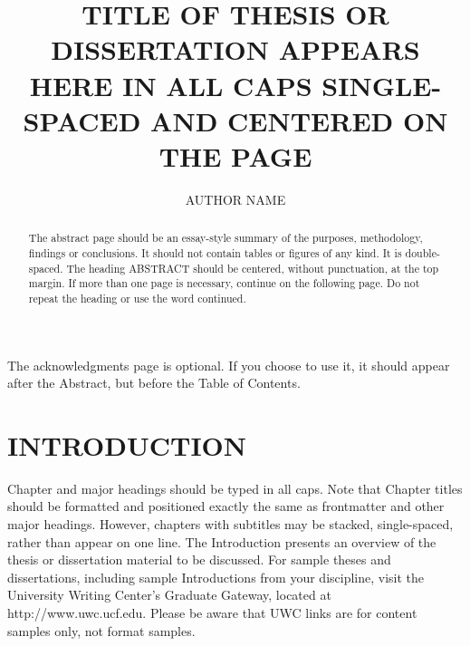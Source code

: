 \documentclass{UCF_ETD}
\title{TITLE OF THESIS OR DISSERTATION APPEARS HERE IN ALL CAPS SINGLE-SPACED AND CENTERED ON THE PAGE} %
\author{AUTHOR NAME} %
\begin{document}
\frontmatter

\maketitle


\begin{abstract}
The abstract page should be an essay-style summary of the purposes, methodology, findings or conclusions. It should not contain tables or figures of any kind. It is double-spaced. The heading ABSTRACT should be centered, without punctuation, at the top margin. If more than one page is necessary, continue on the following page. Do not repeat the heading or use the word continued.
\end{abstract}

\dedication{Should you choose to include a dedication, it should be centered vertically on the page. If you choose, you may center it horizontally as well, provided that it is no longer than a paragraph. There should be no heading on the dedication page. This is the only major section with no heading.}

\begin{acknowledgments}
The acknowledgments page is optional. If you choose to use it, it should appear after the Abstract, but before the Table of Contents.
\end{acknowledgments}

\tableofcontents

\listoffigures

\listoftables

\mainmatter

\chapter{INTRODUCTION} 
Chapter and major headings should be typed in all caps.  Note that Chapter titles should be formatted and positioned exactly the same as frontmatter and other major headings. However, chapters with subtitles may be stacked, single-spaced, rather than appear on one line.
The Introduction presents an overview of the thesis or dissertation material to be discussed. For sample theses and dissertations, including sample Introductions from your discipline, visit the University Writing Center’s Graduate Gateway, located at http://www.uwc.ucf.edu. Please be aware that UWC links are for content samples only, not format samples.
\end{document}
